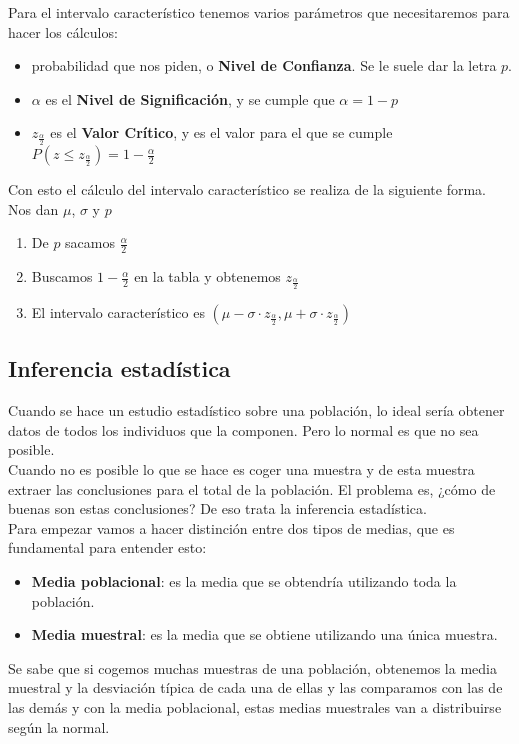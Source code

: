\documentclass[a4paper,10pt,answers]{exam}
\begin{document}
Para el intervalo característico tenemos varios parámetros que necesitaremos para hacer los cálculos:
\begin{itemize}
	\item probabilidad que nos piden, o \textbf{Nivel de Confianza}. Se le suele dar la letra $p$.
	\item $\alpha$ es el \textbf{Nivel de Significación}, y se cumple que $\alpha = 1 - p$
	\item $z_\frac{\alpha}{2}$ es el \textbf{Valor Crítico}, y es el valor para el que se cumple
	$P(z \leq z_{\frac{\alpha}{2}}) = 1-\frac{\alpha}{2}$
\end{itemize}
Con esto el cálculo del intervalo característico se realiza de la siguiente forma.\\
Nos dan $\mu$, $\sigma$ y $p$
\begin{enumerate}
	\item De $p$ sacamos $\frac{\alpha}{2}$
	\item Buscamos $1-\frac{\alpha}{2}$ en la tabla y obtenemos $z_\frac{\alpha}{2}$
	\item El intervalo característico es $(\mu - \sigma \cdot z_\frac{\alpha}{2}, \mu + \sigma \cdot z_\frac{\alpha}{2})$
\end{enumerate}

\subsection*{Inferencia estadística}
Cuando se hace un estudio estadístico sobre una población, lo ideal sería obtener datos de todos los individuos que la componen. Pero lo normal es que no sea posible.\\
Cuando no es posible lo que se hace es coger una muestra y de esta muestra extraer las conclusiones para el total de la población. El problema es, ¿cómo de buenas son estas conclusiones? De eso trata la inferencia estadística.\\

Para empezar vamos a hacer distinción entre dos tipos de medias, que es fundamental para entender esto:
\begin{itemize}
	\item \textbf{Media poblacional}: es la media que se obtendría utilizando toda la población.
	\item \textbf{Media muestral}: es la media que se obtiene utilizando una única muestra.
\end{itemize}

Se sabe que si cogemos muchas muestras de una población, obtenemos la media muestral y la desviación típica de cada una de ellas y las comparamos con las de las demás y con la media poblacional, estas medias muestrales van a distribuirse según la normal.\\
\end{document}
